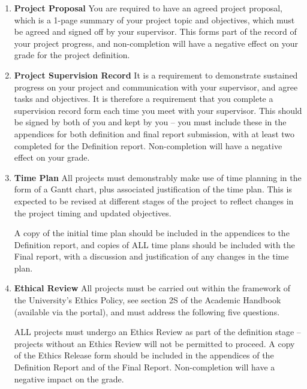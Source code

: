 \begin{enumerate}
    \item \textbf{Project Proposal}
    \subitem You are required to have an agreed project proposal, which is a 1-page summary of your project
    topic and objectives, which must be agreed and signed off by your supervisor. This forms part of
    the record of your project progress, and non-completion will have a negative effect on your grade
    for the project definition.

    \item \textbf{Project Supervision Record}
    \subitem It is a requirement to demonstrate sustained progress on your project and communication with your supervisor, and agree tasks and objectives. It is therefore a requirement that you complete a
    supervision record form each time you meet with your supervisor. This should be signed by both of
    you and kept by you – you must include these in the appendices for both definition and final report
    submission, with at least two completed for the Definition report. Non-completion will have a
    negative effect on your grade.

    \item \textbf{Time Plan}
    \subitem  All projects must demonstrably make use of time planning in the form of a Gantt chart, plus
    associated justification of the time plan. This is expected to be revised at different stages of the
    project to reflect changes in the project timing and updated objectives.

    A copy of the initial time plan should be included in the appendices to the Definition report, and
    copies of ALL time plans should be included with the Final report, with a discussion and justification
    of any changes in the time plan.

    \item \textbf{Ethical Review}
    \subitem All projects must be carried out within the framework of the University’s Ethics Policy, see section 2S of the Academic Handbook (available via the portal), and must address the following five questions.

    ALL projects must undergo an Ethics Review as part of the definition stage – projects without an Ethics Review will not be permitted to proceed. A copy of the Ethics Release form should be included in the appendices of the Definition Report and of the Final Report. Non-completion will have a negative impact on the grade.
    

\end{enumerate}

